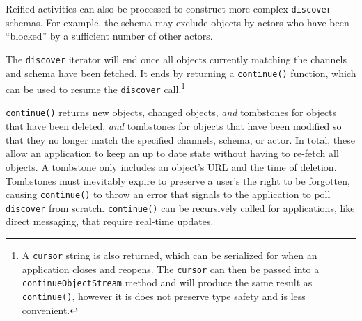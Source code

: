 Reified activities can also be processed to construct more
complex \texttt{discover} schemas.
For example, the schema may exclude objects by
actors who have been ``blocked'' by a sufficient
number of other actors.

The \texttt{discover} iterator will end once all objects
currently matching the channels and schema have been fetched.
It ends by returning a
\texttt{continue()} function,
which can be used to resume
the \texttt{discover} call.\footnote{
    A \texttt{cursor} string is also returned, which can be
    serialized for when an application closes and reopens.
    The \texttt{cursor} can then be passed into a \texttt{continueObjectStream}
    method and will produce the same result as \texttt{continue()},
    however it is does not preserve type safety and is less convenient.
}

\texttt{continue()} returns new objects, changed objects, \emph{and}
tombstones for objects that have been deleted, \emph{and} tombstones
for objects that have been modified so that they no longer match the
specified channels, schema, or actor.
In total, these allow an application to keep an up to date state
without having to re-fetch all objects.
A tombstone only includes an object's URL and the time of deletion.
Tombstones must inevitably expire to preserve a user's the right to be forgotten,
causing \texttt{continue()} to throw an error
that signals to the application to poll \texttt{discover} from scratch.
\texttt{continue()} can be recursively called for applications,
like direct messaging, that require real-time updates.



